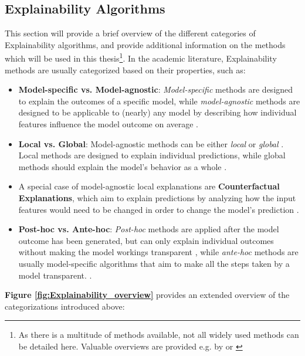\subsection{Explainability Algorithms}\label{subsec:algorithms}

This section will provide a brief overview of the different categories of Explainability algorithms, and provide additional information on the methods which will be used in this thesis\footnote{As there is a multitude of methods available, not all widely used methods can be detailed here. Valuable overviews are provided e.g. by \cite{SALEEM2022165} or \cite{Molnar2023}}.
In the academic literature, Explainability methods are usually categorized based on their properties, such as:
\begin{itemize}
    \item \textbf{Model-specific vs. Model-agnostic}: \textit{Model-specific} methods are designed to explain the outcomes of a specific model, while \textit{model-agnostic} methods are designed to be applicable to (nearly) any model by describing how individual features influence the model outcome on average \parencite{Molnar2023}.
    \item \textbf{Local vs. Global}: Model-agnostic methods can be either \textit{local} or \textit{global} \parencite{Molnar2023}. Local methods are designed to explain individual predictions, while global methods should explain the model's behavior as a whole \parencite{SALEEM2022165}.
    \item A special case of model-agnostic local explanations are \textbf{Counterfactual Explanations}, which aim to explain predictions by analyzing how the input features would need to be changed in order to change the model's prediction \parencite{wachter2017}.
    \item \textbf{Post-hoc vs. Ante-hoc}: \textit{Post-hoc} methods are applied after the model outcome has been generated, but can only explain individual outcomes without making the model workings transparent \parencite{Lipton2018}, while \textit{ante-hoc} methods are usually model-specific algorithms that aim to make all the steps taken by a model transparent. \parencite{SALEEM2022165}.
\end{itemize}

\textbf{Figure \ref{fig:Explainability_overview}} provides an extended overview of the categorizations introduced above:

